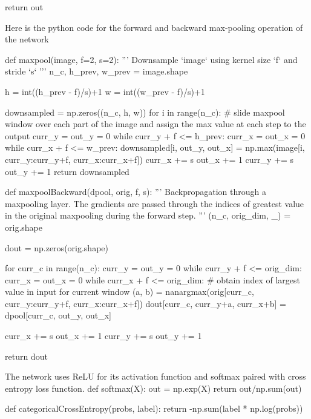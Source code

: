     return out
\stoptyping
\stopsubsection

\startsubsection[title=Max pooling]
Here is the python code for the forward and backward max-pooling operation of the network

\starttyping
def maxpool(image, f=2, s=2):
    '''
    Downsample `image` using kernel size `f` and stride `s`
    '''
    n_c, h_prev, w_prev = image.shape
    
    h = int((h_prev - f)/s)+1
    w = int((w_prev - f)/s)+1
    
    downsampled = np.zeros((n_c, h, w))
    for i in range(n_c):
        # slide maxpool window over each part of the image and assign the max value at each step to the output
        curr_y = out_y = 0
        while curr_y + f <= h_prev:
            curr_x = out_x = 0
            while curr_x + f <= w_prev:
                downsampled[i, out_y, out_x] = np.max(image[i, curr_y:curr_y+f, curr_x:curr_x+f])
                curr_x += s
                out_x += 1
            curr_y += s
            out_y += 1
    return downsampled
\stoptyping

\starttyping
def maxpoolBackward(dpool, orig, f, s):
    '''
    Backpropagation through a maxpooling layer. The gradients are passed through the indices of greatest value in the original maxpooling during the forward step.
    '''
    (n_c, orig_dim, _) = orig.shape
    
    dout = np.zeros(orig.shape)
    
    for curr_c in range(n_c):
        curr_y = out_y = 0
        while curr_y + f <= orig_dim:
            curr_x = out_x = 0
            while curr_x + f <= orig_dim:
                # obtain index of largest value in input for current window
                (a, b) = nanargmax(orig[curr_c, curr_y:curr_y+f, curr_x:curr_x+f])
                dout[curr_c, curr_y+a, curr_x+b] = dpool[curr_c, out_y, out_x]
                
                curr_x += s
                out_x += 1
            curr_y += s
            out_y += 1
        
    return dout
\stoptyping



\stopsubsection

\startsubsection[title=Various functions]
The network uses ReLU for its activation function and softmax paired with cross entropy loss function.
\starttyping
def softmax(X):
    out = np.exp(X)
    return out/np.sum(out)

def categoricalCrossEntropy(probs, label):
    return -np.sum(label * np.log(probs))
\stopstyping

